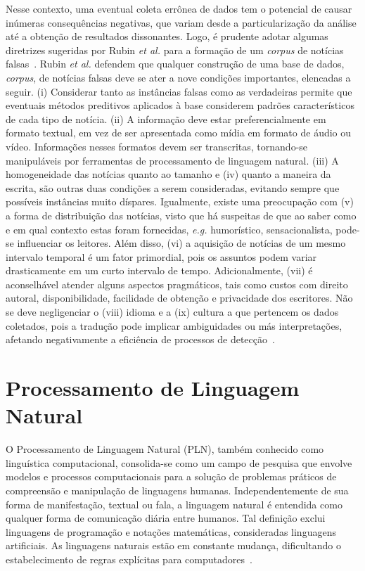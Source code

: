 \documentclass{SBCbookchapter}
\begin{document}
Nesse contexto, uma eventual coleta errônea de dados tem o potencial de causar inúmeras consequências negativas, que variam desde a particularização da análise até a obtenção de resultados dissonantes. Logo, é prudente adotar algumas diretrizes sugeridas por Rubin \textit{et al.} para a formação de um \textit{corpus} de notícias falsas~\cite{rubin2015deception}. Rubin {\it et al.} defendem que qualquer construção de uma base de dados, \textit{corpus}, de notícias falsas deve se ater a nove condições importantes, elencadas a seguir. (i) Considerar tanto as instâncias falsas como as verdadeiras permite que eventuais métodos preditivos aplicados à base considerem padrões característicos de cada tipo de notícia. (ii) A informação deve estar preferencialmente em formato textual, em vez de ser apresentada como mídia em formato de áudio ou vídeo. Informações nesses formatos devem ser transcritas, tornando-se manipuláveis por ferramentas de processamento de linguagem natural. (iii) A homogeneidade das notícias quanto ao tamanho e (iv) quanto a maneira da escrita, são outras duas condições a serem consideradas, evitando sempre que possíveis instâncias muito díspares. Igualmente, existe uma preocupação com (v) a forma de distribuição das notícias, visto que há suspeitas de que ao saber como e em qual contexto estas foram fornecidas, \textit{e.g.} humorístico, sensacionalista, pode-se influenciar os leitores. Além disso, (vi) a aquisição de notícias de um mesmo intervalo temporal é um fator primordial, pois os assuntos podem variar drasticamente em um curto intervalo de tempo. Adicionalmente, (vii) é aconselhável atender alguns aspectos pragmáticos, tais como custos com direito autoral, disponibilidade, facilidade de obtenção e privacidade dos escritores. Não se deve negligenciar o (viii) idioma e a (ix) cultura a que pertencem os dados coletados, pois a tradução pode implicar ambiguidades ou más interpretações, afetando negativamente a eficiência de processos de detecção~\cite{rubin2015deception,rubin2014pragmatic}.


\section{Processamento de Linguagem Natural}
\label{sec:nlp}

O Processamento de Linguagem Natural (PLN), também conhecido como linguística computacional, consolida-se como um campo de pesquisa que envolve modelos e processos computacionais para a solução de problemas práticos de compreensão e manipulação de linguagens humanas. Independentemente de sua forma de manifestação, textual ou fala, a linguagem natural é entendida como qualquer forma de comunicação diária entre humanos. Tal definição exclui linguagens de programação e notações matemáticas, consideradas linguagens artificiais. As linguagens naturais estão em constante mudança, dificultando o estabelecimento de regras explícitas para computadores~\cite{clark2012automatically, otter2020survey, bird2009natural}.
\end{document}
